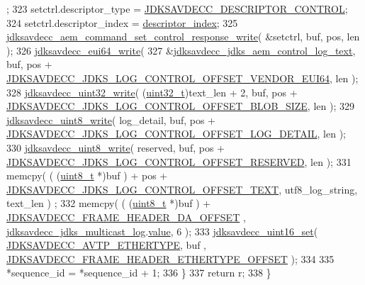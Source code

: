 \begin{DoxyCode}
      ;
323         setctrl.descriptor\_type = \hyperlink{group__descriptor_gaafb6bdc564bbe2b62cb6f91bdb8185a8}{JDKSAVDECC\_DESCRIPTOR\_CONTROL};
324         setctrl.descriptor\_index = \hyperlink{structjdksavdecc__aem__command__set__control__response_a042bbc76d835b82d27c1932431ee38d4}{descriptor\_index};
325         \hyperlink{group__command__set__control__response_ga1baf427e932ebec21bb6bc41e2fb4d74}{jdksavdecc\_aem\_command\_set\_control\_response\_write}(
       &setctrl, buf, pos, len );
326         \hyperlink{group__eui64_ga9a35f8b0a8e81f3f169892e3d0f3c7ad}{jdksavdecc\_eui64\_write}(
327             &\hyperlink{group__jdks__log_ga492c3be3079a48fdf9366bdc514c0333}{jdksavdecc\_jdks\_aem\_control\_log\_text}, buf, pos + 
      \hyperlink{group__jdks__log_gaa09f0dec1864081c2abbc426b9e387fd}{JDKSAVDECC\_JDKS\_LOG\_CONTROL\_OFFSET\_VENDOR\_EUI64}, len );
328         \hyperlink{group__endian_ga5c8d1aadb6e4ea355503a1945cfdbb92}{jdksavdecc\_uint32\_write}( (\hyperlink{parse_8c_a6eb1e68cc391dd753bc8ce896dbb8315}{uint32\_t})text\_len + 2, buf, pos + 
      \hyperlink{group__jdks__log_ga14027480ca9c47f6e02e3d96e3e9a1ad}{JDKSAVDECC\_JDKS\_LOG\_CONTROL\_OFFSET\_BLOB\_SIZE}, len );
329         \hyperlink{group__endian_ga76773f9a39ae810aec586d2bb3b617e5}{jdksavdecc\_uint8\_write}( log\_detail, buf, pos + 
      \hyperlink{group__jdks__log_ga15244e4065b3ef420cd990e0d2e6bc0d}{JDKSAVDECC\_JDKS\_LOG\_CONTROL\_OFFSET\_LOG\_DETAIL}, len );
330         \hyperlink{group__endian_ga76773f9a39ae810aec586d2bb3b617e5}{jdksavdecc\_uint8\_write}( reserved, buf, pos + 
      \hyperlink{group__jdks__log_gad860e4d61ae3f91cd3f9799e6b1dd3c5}{JDKSAVDECC\_JDKS\_LOG\_CONTROL\_OFFSET\_RESERVED}, len );
331         memcpy( ( (\hyperlink{stdint_8h_aba7bc1797add20fe3efdf37ced1182c5}{uint8\_t} *)buf ) + pos + 
      \hyperlink{group__jdks__log_gaa3f2c42190fdfb5a9f8927254dcc38f0}{JDKSAVDECC\_JDKS\_LOG\_CONTROL\_OFFSET\_TEXT}, utf8\_log\_string, text\_len )
      ;
332         memcpy( ( (\hyperlink{stdint_8h_aba7bc1797add20fe3efdf37ced1182c5}{uint8\_t} *)buf ) + \hyperlink{group__pdu_ga1ca97f0df513588adc216b94f3ddea47}{JDKSAVDECC\_FRAME\_HEADER\_DA\_OFFSET}
      , \hyperlink{group__jdks__log_gae6aee409d176c6cbbc79c18ec2bed520}{jdksavdecc\_jdks\_multicast\_log}.\hyperlink{structjdksavdecc__eui48_a18b93f04637cf37688ec10a33a0cbc26}{value}, 6 );
333         \hyperlink{group__endian_ga14b9eeadc05f94334096c127c955a60b}{jdksavdecc\_uint16\_set}( \hyperlink{group__pdu_ga9fe7bd6b7d7b0f92f5fdbb910068197f}{JDKSAVDECC\_AVTP\_ETHERTYPE}, buf
      , \hyperlink{group__pdu_ga8dde9191880d2dd9f96462655467f90f}{JDKSAVDECC\_FRAME\_HEADER\_ETHERTYPE\_OFFSET} );
334 
335         *sequence\_id = *sequence\_id + 1;
336     \}
337     \textcolor{keywordflow}{return} r;
338 \}
\end{DoxyCode}


